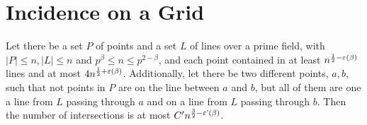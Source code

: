 \chapter{Incidence on a Grid}
\label{chap:inc_grid}

\begin{theorem}
    \label{ST_prime_field_proj}
    \leanok
    Let there be a set $P$ of points and a set $L$ of lines over a prime field, 
    with $|P| \leq n, |L| \leq n$ and $p^\beta \leq n \leq p^{2 - \beta}$,
    and each point contained in at least $n^{\frac12 - \operatorname{\varepsilon}(\beta)}$ lines
    and at most $4 n^{\frac12 + \operatorname{\varepsilon}(\beta)}$. Additionally, let there be two different points,
    $a, b$, such that not points in $P$ are on the line between $a$ and $b$, but all of them are one a line from $L$
    passing through $a$ and on a line from $L$ passing through $b$.
    Then the number of intersections is at most $C' n^{\frac32 - \operatorname{\varepsilon'}(\beta)}$.
\end{theorem}

